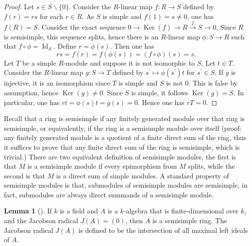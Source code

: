 \documentclass[12pt,a4paper]{report}
\theoremstyle{definition}
\newtheorem{lemma}[theorem]{Lemma}
\theoremstyle{remark}
\theoremstyle{definition}
\begin{document}
\begin{proof}
    Let $s \in S \backslash\{0\}$. Consider the $R$-linear map $f: R \rightarrow S$ defined by $f(r)=r s$ for each $r \in R$. As $S$ is simple and $f(1)=s \neq 0$, one has $f(R)=S$. Consider the exact sequence $0 \rightarrow \operatorname{Ker}(f) \rightarrow R \xrightarrow{f} S \rightarrow 0$. Since $R$ is semisimple, this sequence splits, hence there is an $R$-linear map $\phi: S \rightarrow R$ such that $f \circ \phi=\operatorname{Id}_{S}$. Define $r=\phi(s)$. Then one has 
    \begin{equation*}
        r s=f(r)=f(\phi(s))=(f \circ \phi)(s)=s.
    \end{equation*}
Let $T$ be a simple $R$-module and suppose it is not isomorphic to $S$. Let $t \in T$. Consider the $R$-linear map $g: S \rightarrow T$ defined by $s^{\prime} \mapsto \phi\left(s^{\prime}\right) t$ for $s^{\prime} \in S$. If $g$ is injective, it is an isomorphism since $T$ is simple and $S$ is not $0$. This is false by assumption, hence $\operatorname{Ker}(g) \neq 0$. Since $S$ is simple, it follows $\operatorname{Ker}(g)=S$. In particular, one has $r t=\phi(s) t=g(s)=0$. Hence one has $r T=0$.
\end{proof}
Recall that a ring is semisimple if any finitely generated module over that ring is semisimple, or equivalently, if the ring is a semisimple module over itself (proof: any finitely generated module is a quotient of a finite direct sum of the ring, thus it suffices to prove that any finite direct sum of the ring is semisimple, which is trivial.) There are two equivalent definition of semisimple modules, the first is that $M$ is a semisimple module if every epimorphism from $M$ splits, while the second is that $M$ is a direct sum of simple modules. A standard property of semisimple modules is that, submodules of semisimple modules are semisimple, in fact,  submodules are always direct summands of a semisimple module.
\begin{lemma}[{\cite[Lemma 2.9]{eggermont_generalizations_2011}}]\label{lemma: 2.9}
If $k$ is a field and $A$ is a $k$-algebra that is finite-dimensional over $k$, and the Jacobson radical $J(A) = (0)$, then $A$ is a semisimple ring.\smallbreak
The Jacobson radical $J(A)$ is defined to be the intersection of all maximal left ideals of $A$.
\end{lemma}
\end{document}
